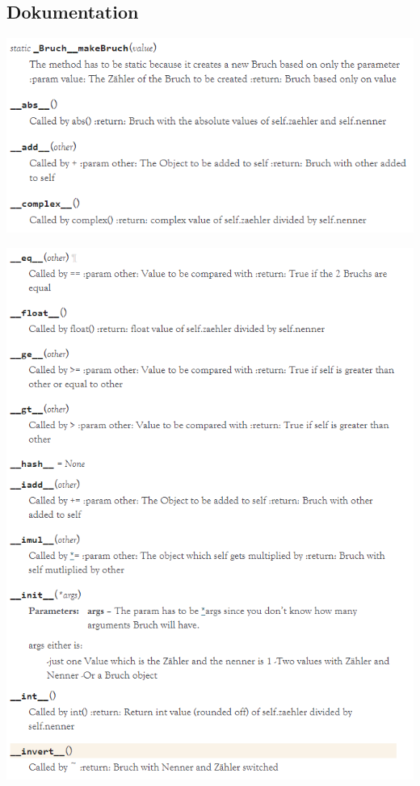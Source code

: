 \subsection{Dokumentation}

\begin{minipage}{\linewidth}
	\centering
	\includegraphics[width=1\linewidth]{images/dokumentation1}
\end{minipage}

\begin{minipage}{\linewidth}
	\centering
	\includegraphics[width=1\linewidth]{images/dokumentation2}
\end{minipage}

